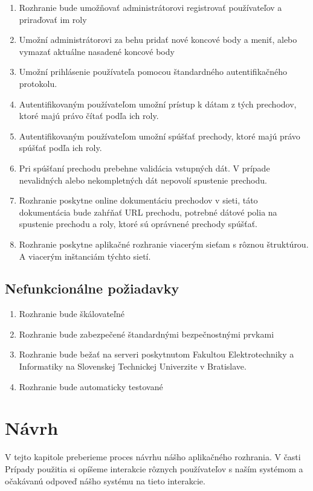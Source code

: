 \begin{enumerate}
\item Rozhranie bude umožňovať administrátorovi registrovať používateľov a priraďovať im roly
\item Umožní administrátorovi za behu pridať nové koncové body a meniť, alebo vymazať aktuálne nasadené koncové body
\item Umožní prihlásenie používateľa pomocou štandardného autentifikačného protokolu.
\item Autentifikovaným používateľom umožní prístup k dátam z tých prechodov, ktoré majú právo čítať podľa ich roly.
\item Autentifikovaným používateľom umožní spúšťať prechody, ktoré majú právo spúšťať podľa ich roly.
\item Pri spúšťaní prechodu prebehne validácia vstupných dát. V prípade nevalidných alebo nekompletných dát nepovolí spustenie prechodu.
\item Rozhranie poskytne online dokumentáciu prechodov v sieti, táto dokumentácia bude zahŕňať URL prechodu, potrebné dátové polia na spustenie prechodu a roly, ktoré sú oprávnené prechody spúšťať.
\item Rozhranie poskytne aplikačné rozhranie viacerým sieťam s rôznou štruktúrou. A viacerým inštanciám týchto sietí.
\end{enumerate}

\subsection{Nefunkcionálne požiadavky}
\begin{enumerate}
\item Rozhranie bude škálovateľné
\item Rozhranie bude zabezpečené štandardnými bezpečnostnými prvkami
\item Rozhranie bude bežať na serveri poskytnutom Fakultou Elektrotechniky a Informatiky na Slovenskej Technickej Univerzite v Bratislave.
\item Rozhranie bude automaticky testované 
\end{enumerate}

\section{Návrh}
V tejto kapitole preberieme proces návrhu nášho aplikačného rozhrania. V časti Prípady použitia si opíšeme interakcie rôznych používateľov s naším systémom a očakávanú odpoveď nášho systému na tieto interakcie.

